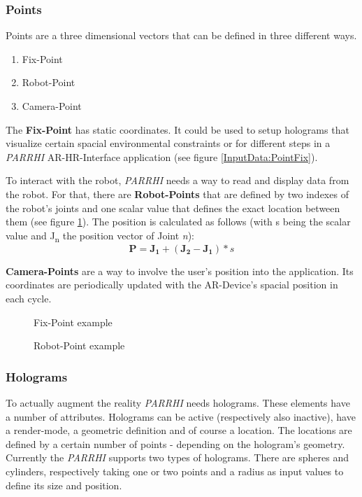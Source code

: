 \subsubsection{Points}\label{Section:Points}
Points are a three dimensional vectors that can be defined in three different ways. 
\begin{enumerate}
	\setlength\itemsep{-1em}
	\item Fix-Point
	\item Robot-Point
	\item Camera-Point
\end{enumerate}

The \textbf{Fix-Point} has static coordinates. It could be used to setup holograms that visualize certain spacial environmental constraints or for different steps in a \textit{PARRHI} AR-HR-Interface application (see figure \ref{InputData:PointFix}).

To interact with the robot, \textit{PARRHI} needs a way to read and display data from the robot. For that, there are \textbf{Robot-Points} that are defined by two indexes of the robot's joints and one scalar value that defines the exact location between them (see figure \ref{InputData:PointRobot}). The position is calculated as follows (with s being the scalar value and J\textsubscript{n} the position vector of Joint \textit{n}):
\begin{equation}
\boldsymbol{P} = \boldsymbol{J_1} + (\boldsymbol{J_2}-\boldsymbol{J_1}) * s
\end{equation}

\textbf{Camera-Points} are a way to involve the user's position into the application. Its coordinates are periodically updated with the AR-Device's spacial position in each cycle.


\begin{figure}
	\begin{minipage}{0.45\textwidth}
		\centering
		
		\caption{Fix-Point example}
		\label{InputData:PointFix}
	\end{minipage}\hfill
	\begin{minipage}{0.45\textwidth}
		\centering
		
		\caption{Robot-Point example}
		\label{InputData:PointRobot}
	\end{minipage}
\end{figure}


\subsubsection{Holograms}\label{Section:Holograms}
To actually augment the reality \textit{PARRHI} needs holograms. These elements have a number of attributes. Holograms can be active (respectively also inactive), have a render-mode, a geometric definition and of course a location. The locations are defined by a certain number of points - depending on the hologram's geometry. Currently the \textit{PARRHI} supports two types of holograms. There are spheres and cylinders, respectively taking one or two points and a radius as input values to define its size and position.

